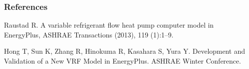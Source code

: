 \subsubsection{References}\label{references-051}

Raustad R. A variable refrigerant flow heat pump computer model in EnergyPlus, ASHRAE Transactions (2013), 119 (1):1--9.

Hong T, Sun K, Zhang R, Hinokuma R, Kasahara S, Yura Y. Development and Validation of a New VRF Model in EnergyPlus. ASHRAE Winter Conference.
